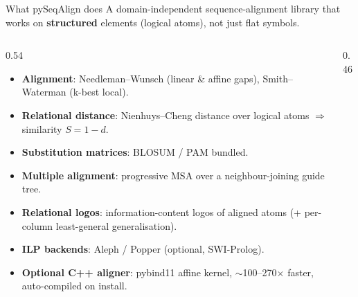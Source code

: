 \documentclass[aspectratio=169,10pt]{beamer}
\newcommand{\atom}[1]{\texttt{#1}}
\begin{document}
\begin{frame}{What pySeqAlign does}
  A \alert{domain-independent} sequence-alignment library that works on
  \textbf{structured} elements (logical atoms), not just flat symbols.
  \vspace{0.4em}
  \begin{columns}[T]
    \begin{column}{0.54\textwidth}
      \begin{itemize}
        \item \textbf{Alignment}: Needleman--Wunsch (linear \& affine gaps),
              Smith--Waterman (k-best local).
        \item \textbf{Relational distance}: Nienhuys--Cheng distance over
              logical atoms $\Rightarrow$ similarity $S=1-d$.
        \item \textbf{Substitution matrices}: BLOSUM / PAM bundled.
        \item \textbf{Multiple alignment}: progressive MSA over a
              neighbour-joining guide tree.
        \item \textbf{Relational logos}: information-content logos of aligned
              atoms (+ per-column least-general generalisation).
        \item \textbf{ILP backends}: Aleph / Popper (optional, SWI-Prolog).
        \item \textbf{Optional C++ aligner}: pybind11 affine kernel,
              $\sim$100--270$\times$ faster, auto-compiled on install.
      \end{itemize}
    \end{column}
    \begin{column}{0.46\textwidth}
      \centering
    \end{column}
  \end{columns}
\end{frame}
\end{document}
